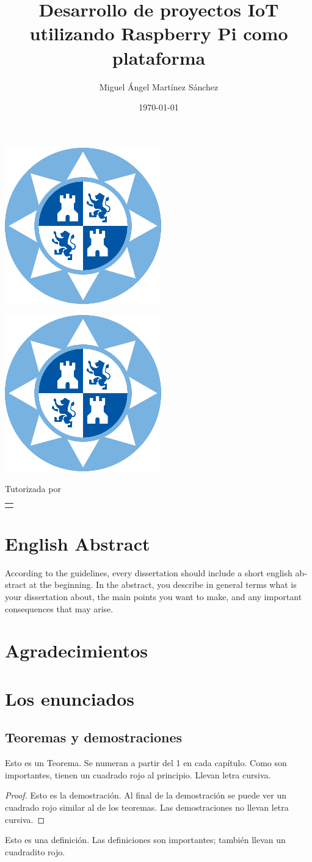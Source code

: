 \documentclass[12pt, twoside]{book}
\title{Desarrollo de proyectos IoT utilizando Raspberry Pi como plataforma}
\author{Miguel Ángel Martínez Sánchez}
\date{\today}
\makeatletter
\renewcommand\maketitle{%
  \begin{titlepage}
      \vspace*{1.5cm}
      \parskip=0pt
      \Huge\bfseries
      \begin{center}
          \leavevmode\includegraphics[totalheight=6cm]{sello.png}\\[2cm]
          \@title
      \end{center}
      \vspace{1cm}
      \begin{center}
          \@author
      \end{center}
  \end{titlepage}
  
  \begin{titlepage}
  \parindent=0pt
  \begin{flushleft}
  \vspace*{1.5mm}
  \setlength\baselineskip{0pt}
  \setlength\parskip{0mm}
  \begin{center}
      \leavevmode\includegraphics[totalheight=4.5cm]{sello.png}
  \end{center}
  \end{flushleft}
  \vspace{1cm}
  \bgroup
  \Large \bfseries
  \begin{center}
  \@title
  \end{center}
  \egroup
  \vspace*{.5cm}
  \begin{center}
  \@author
  \end{center}
  \vspace*{1.8cm}
  \begin{flushright}
  \begin{minipage}{8.45cm}

      \vspace*{7.5mm}

      Tutorizada por
  \end{minipage}\par
  \begin{tabularx}{8.45cm}[b]{@{}l}
      \guardatutores
  \end{tabularx}
   \end{flushright}
      \vspace*{\fill}
   \end{titlepage}
   \pagestyle{tfg}
   \renewcommand{\chaptermark}[1]{\markright{\thechapter.\space ##1}}
   \renewcommand{\sectionmark}[1]{}
   \renewcommand{\subsectionmark}[1]{}
  }
\makeatother
\begin{document}
 

\maketitle

\frontmatter
\tableofcontents

\mainmatter


\chapter*{English Abstract}



\begin{otherlanguage}{english}
    According to the guidelines, every dissertation should include a short english abstract at the beginning. In the abstract, you describe in general terms what is your dissertation about, the main points you want to make, and any important consequences that may arise.
\end{otherlanguage}

\chapter*{Agradecimientos}
\chapter{Los enunciados}

\section{Teoremas y demostraciones}


\begin{theorem}[Euclides]\label{thm:th1}
    Esto es un Teorema. Se numeran a partir del 1 en cada capítulo. Como son importantes, tienen un cuadrado rojo al principio. Llevan letra cursiva.
\end{theorem}

\begin{proof}
    Esto es la demostración. Al final de la demostración se puede ver un cuadrado rojo similar al de los teoremas. Las demostraciones no llevan letra cursiva.
\end{proof}


\begin{definition}\label{def:1}
    Esto es una definición. Las definiciones son importantes; también llevan un cuadradito rojo.
\end{definition}
\end{document}
